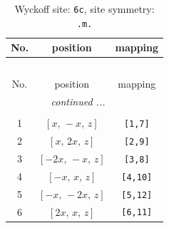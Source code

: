 \documentclass[fleqn,8pt]{jsarticle}
\begin{document}
\renewcommand{\arraystretch}{1.2}
\begin{longtable}{ccc}
\caption{Wyckoff site: {\tt 6c}, site symmetry: {\tt .m.}}
 \\
 \hline \hline
No. & position & mapping \\ \hline \endfirsthead

\multicolumn{2}{l}{\tablename\ \thetable{}} \\
 \hline \hline
No. & position & mapping \\ \hline \endhead

 \hline \hline
\multicolumn{2}{r}{\footnotesize\it continued ...} \\ \endfoot

 \hline \hline
\multicolumn{2}{r}{} \\ \endlastfoot

1 & $\left[ x,\, - x,\, z \right]$ & {\tt [1,7]} \\ \hline
2 & $\left[ x,\, 2 x,\, z \right]$ & {\tt [2,9]} \\ \hline
3 & $\left[ - 2 x,\, - x,\, z \right]$ & {\tt [3,8]} \\ \hline
4 & $\left[ - x,\, x,\, z \right]$ & {\tt [4,10]} \\ \hline
5 & $\left[ - x,\, - 2 x,\, z \right]$ & {\tt [5,12]} \\ \hline
6 & $\left[ 2 x,\, x,\, z \right]$ & {\tt [6,11]} \\
\end{longtable}
\renewcommand{\arraystretch}{1.2}
\end{document}
